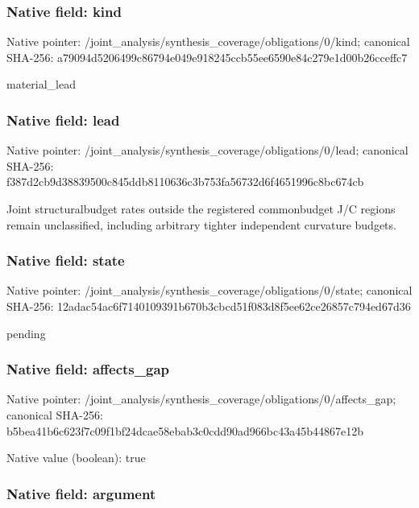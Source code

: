 \documentclass[10pt,a4paper]{article}
\begin{document}
\subsubsection{Native field: kind}


Native pointer: /joint\_analysis/synthesi\allowbreak{}s\_coverage/obligations/0\allowbreak{}/kind; canonical SHA-256: a79094d5206499c86794e049\allowbreak{}e918245ccb55ee6590e84c27\allowbreak{}9e1d00b26cceffc7


material\_lead


\subsubsection{Native field: lead}


Native pointer: /joint\_analysis/synthesi\allowbreak{}s\_coverage/obligations/0\allowbreak{}/lead; canonical SHA-256: f387d2cb9d38839500c845dd\allowbreak{}b8110636c3b753fa56732d6f\allowbreak{}4651996c8bc674cb


Joint structuralbudget rates outside the registered commonbudget J/C regions remain unclassified, including arbitrary tighter independent curvature budgets.


\subsubsection{Native field: state}


Native pointer: /joint\_analysis/synthesi\allowbreak{}s\_coverage/obligations/0\allowbreak{}/state; canonical SHA-256: 12adac54ac6f7140109391b6\allowbreak{}70b3cbcd51f083d8f5ee62ce\allowbreak{}26857c794ed67d36


pending


\subsubsection{Native field: affects\_gap}


Native pointer: /joint\_analysis/synthesi\allowbreak{}s\_coverage/obligations/0\allowbreak{}/affects\_gap; canonical SHA-256: b5bea41b6c623f7c09f1bf24\allowbreak{}dcae58ebab3c0cdd90ad966b\allowbreak{}c43a45b44867e12b



Native value (boolean): true



\subsubsection{Native field: argument}
\end{document}
